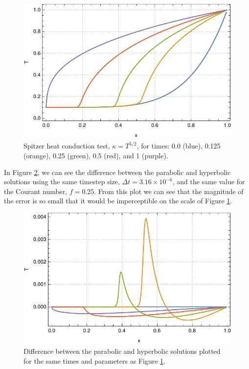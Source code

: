 \documentclass[iop]{emulateapj}
\begin{document}
		\begin{figure}[h!]
			\centering
			\includegraphics[width=\columnwidth]{figures/T_spitzer}
			\caption{Spitzer heat conduction test, $\kappa = T^{5/2}$, for times: 0.0 (blue), 0.125 (orange), 0.25 (green), 0.5 (red), and 1 (purple).}
			\label{spitzer_test}
		\end{figure}
		
		In Figure \ref{error}, we can see the difference between the parabolic and hyperbolic solutions using the same timestep size, $\Delta t = 3.16 \times 10^{-6}$, and the same value for the Courant number, $f=0.25$.
			From this plot we can see that the magnitude of the error is so small that it would be imperceptible on the scale of Figure \ref{spitzer_test}.
		
		\begin{figure}[h!]
			\centering
			\includegraphics[width=\columnwidth]{figures/T_error}
			\caption{Difference between the parabolic and hyperbolic solutions plotted for the same times and parameters as Figure \ref{spitzer_test}. }
			\label{error}
		\end{figure}
		
\end{document}

